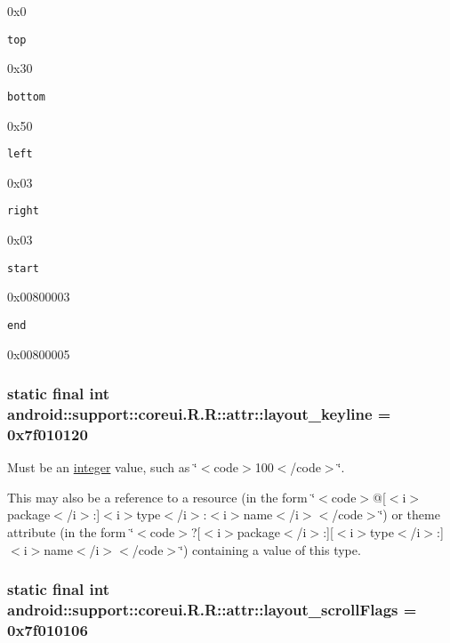 0x0

{\tt top}

0x30

{\tt bottom}

0x50

{\tt left}

0x03

{\tt right}

0x03

{\tt start}

0x00800003

{\tt end}

0x00800005\hypertarget{classandroid_1_1support_1_1coreui_1_1_r_1_1attr_8669ea98de82aa5eaddddc12a303731d}{
\subsubsection[{layout\_\-keyline}]{\setlength{\rightskip}{0pt plus 5cm}static final int android::support::coreui.R.R::attr::layout\_\-keyline = 0x7f010120}}
\label{classandroid_1_1support_1_1coreui_1_1_r_1_1attr_8669ea98de82aa5eaddddc12a303731d}


Must be an \hyperlink{classandroid_1_1support_1_1coreui_1_1_r_1_1integer}{integer} value, such as \char`\"{}$<$code$>$100$<$/code$>$\char`\"{}. 

This may also be a reference to a resource (in the form \char`\"{}$<$code$>$@\mbox{[}$<$i$>$package$<$/i$>$:\mbox{]}$<$i$>$type$<$/i$>$:$<$i$>$name$<$/i$>$$<$/code$>$\char`\"{}) or theme attribute (in the form \char`\"{}$<$code$>$?\mbox{[}$<$i$>$package$<$/i$>$:\mbox{]}\mbox{[}$<$i$>$type$<$/i$>$:\mbox{]}$<$i$>$name$<$/i$>$$<$/code$>$\char`\"{}) containing a value of this type. \hypertarget{classandroid_1_1support_1_1coreui_1_1_r_1_1attr_bdcd0d35164cc4f4e3033129eb147e6c}{
\subsubsection[{layout\_\-scrollFlags}]{\setlength{\rightskip}{0pt plus 5cm}static final int android::support::coreui.R.R::attr::layout\_\-scrollFlags = 0x7f010106}}
\label{classandroid_1_1support_1_1coreui_1_1_r_1_1attr_bdcd0d35164cc4f4e3033129eb147e6c}


